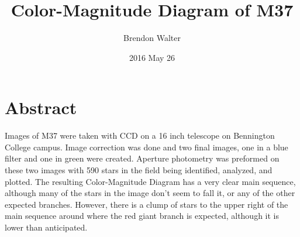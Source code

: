 \documentclass[12pt]{article}
\title{Color-Magnitude Diagram of M37}
\date{2016 May 26}
\author{Brendon Walter}
\begin{document}
	\maketitle
	
	\section{Abstract}
		Images of M37 were taken with CCD on a 16 inch telescope on Bennington College campus. Image correction was done and two final images, one in a blue filter and one in green were created. Aperture photometry was preformed on these two images with 590 stars in the field being identified, analyzed, and plotted. The resulting Color-Magnitude Diagram has a very clear main sequence, although many of the stars in the image don't seem to fall it, or any of the other expected branches. However, there is a clump of stars to the upper right of the main sequence around where the red giant branch is expected, although it is lower than anticipated.
	
\end{document}
